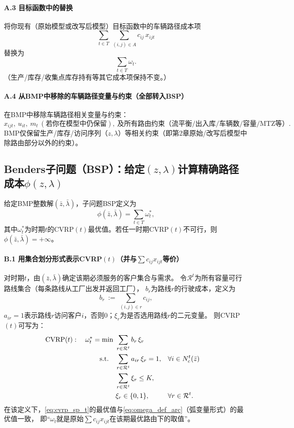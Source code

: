 \documentclass{article}
\begin{document}
\paragraph{A.3 目标函数中的替换}
将你现有（原始模型或改写后模型）目标函数中的车辆路径成本项
\[
\sum_{t\in T}\ \sum_{(i,j)\in A} c_{ij}\,x_{ijt}
\]
替换为
\[
\sum_{t\in T}\omega_t .
\]
（生产/库存/收集点库存持有等其它成本项保持不变。）

\paragraph{A.4 从BMP中移除的车辆路径变量与约束（全部转入BSP）}
在BMP中移除车辆路径相关变量与约束：
\[
x_{ijt},\ u_{it},\ m_t\ (\text{若你在模型中仍保留}),\ \text{及所有路由约束（流平衡/出入库/车辆数/容量/MTZ等）}.
\]
BMP仅保留生产/库存/访问序列（$z,\lambda$）等相关约束（即第2章原始/改写后模型中除路由部分以外的约束）。

\subsection{Benders子问题（BSP）：给定$(z,\lambda)$计算精确路径成本$\phi(z,\lambda)$}

给定BMP整数解$(\bar z,\bar\lambda)$，子问题BSP定义为
\begin{equation}
\phi(\bar z,\bar\lambda)=\sum_{t\in T}\omega_t^*,
\end{equation}
其中$\omega_t^*$为时期$t$的CVRP$(t)$最优值。若任一时期CVRP$(t)$不可行，则$\phi(\bar z,\bar\lambda)=+\infty$。

\paragraph{B.1 用集合划分形式表示CVRP$(t)$（并与$\sum c_{ij}x_{ijt}$等价）}
对时期$t$，由$(\bar z,\bar\lambda)$确定该期必须服务的客户集合与需求。
令$\mathcal R^t$为所有容量可行路线集合（每条路线从工厂出发并返回工厂），
$b_r$为路线$r$的行驶成本，定义为
\begin{equation}
b_r\ :=\ \sum_{(i,j)\in r} c_{ij},
\label{eq:br_def}
\end{equation}
$a_{ir}=1$表示路线$r$访问客户$i$，否则0；$\xi_r$为是否选用路线$r$的二元变量。
则CVRP$(t)$可写为：
\begin{align}
\text{CVRP}(t):\quad
\omega_t^*=\min\ & \sum_{r\in\mathcal R^t} b_r\,\xi_r \notag\\
\text{s.t.}\quad
& \sum_{r\in\mathcal R^t} a_{ir}\,\xi_r = 1, && \forall i\in N_c^t(\bar z) \notag\\
& \sum_{r\in\mathcal R^t} \xi_r \le K, \notag\\
& \xi_r\in\{0,1\}, && \forall r\in\mathcal R^t .
\label{eq:cvrp_sp_t}
\end{align}
在该定义下，\eqref{eq:cvrp_sp_t}的最优值与\eqref{eq:omega_def_arc}（弧变量形式）的最优值一致，
即“$\omega_t$就是原始$\sum c_{ij}x_{ijt}$在该期最优路由下的取值”。
\end{document}
